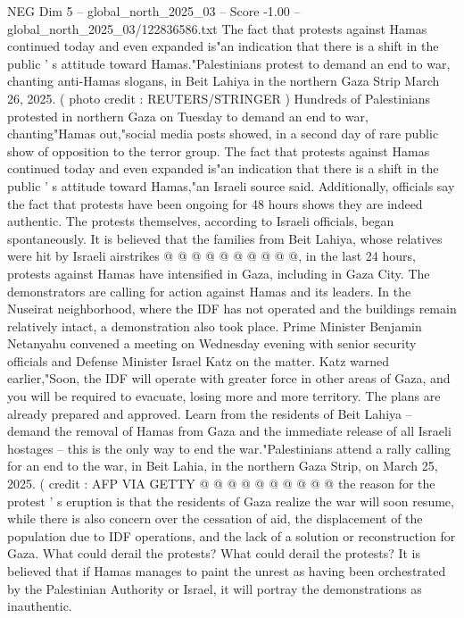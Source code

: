 \begin{textsample}{NEG Dim 5 – global\_north\_2025\_03 – Score -1.00 – global\_north\_2025\_03/122836586.txt}  \label{ex:f5_neg_251}
The fact that protests against Hamas continued today and even expanded is"an indication that there is a shift in the public ' s attitude toward Hamas."Palestinians protest to demand an end to war, chanting anti-Hamas slogans, in Beit Lahiya in the northern Gaza Strip March 26, 2025. ( photo credit : REUTERS/STRINGER ) Hundreds of Palestinians protested in northern Gaza on Tuesday to demand an end to war, chanting"Hamas out,"social media posts showed, in a second day of rare public show of opposition to the terror group.
The fact that protests against Hamas continued today and even expanded is"an indication that there is a shift in the public ' s attitude toward Hamas,"an Israeli source said.
Additionally, officials say the fact that protests have been ongoing for 48 hours shows they are indeed authentic.
The protests themselves, according to Israeli officials, began spontaneously.
It is believed that the families from Beit Lahiya, whose relatives were hit by Israeli airstrikes @ @ @ @ @ @ @ @ @ @, in the last 24 hours, protests against Hamas have intensified in Gaza, including in Gaza City.
The demonstrators are calling for action against Hamas and its leaders.
In the Nuseirat neighborhood, where the IDF has not operated and the buildings remain relatively intact, a demonstration also took place.
Prime Minister Benjamin Netanyahu convened a meeting on Wednesday evening with senior security officials and Defense Minister Israel Katz on the matter.
Katz warned earlier,"Soon, the IDF will operate with greater force in other areas of Gaza, and you will be required to evacuate, losing more and more territory.
The plans are already prepared and approved.
Learn from the residents of Beit Lahiya -- demand the removal of Hamas from Gaza and the immediate release of all Israeli hostages -- this is the only way to end the war."Palestinians attend a rally calling for an end to the war, in Beit Lahia, in the northern Gaza Strip, on March 25, 2025. ( credit : AFP VIA GETTY @ @ @ @ @ @ @ @ @ @ the reason for the protest ' s eruption is that the residents of Gaza realize the war will soon resume, while there is also concern over the cessation of aid, the displacement of the population due to IDF operations, and the lack of a solution or reconstruction for Gaza.
What could derail the protests?
What could derail the protests?
It is believed that if Hamas manages to paint the unrest as having been orchestrated by the Palestinian Authority or Israel, it will portray the demonstrations as inauthentic.

\end{textsample}

